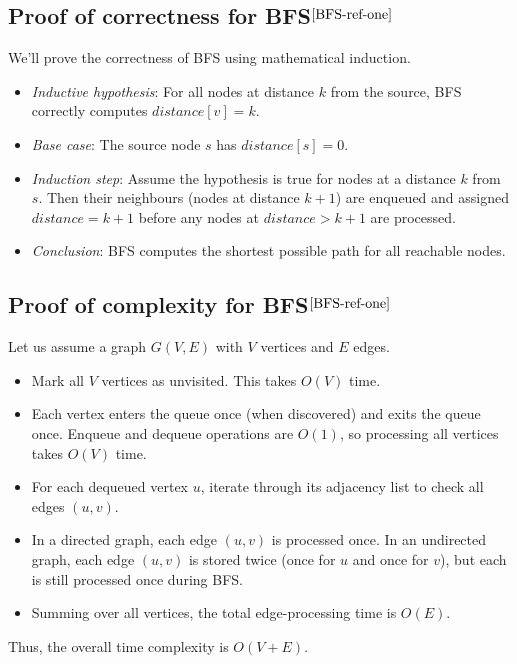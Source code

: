 \cleardoublepage
{}
\begin{appendices}
	\chapter{}
	\section{Proof of correctness for BFS$^{\cite{BFS-ref-one}}$}\label{appendix:bfs:correctness}
		We'll prove the correctness of BFS using mathematical induction.
		\begin{itemize}
			\item \textit{Inductive hypothesis}: For all nodes at distance
			$k$ from the source, BFS correctly computes $distance[v] = k$.
			\item \textit{Base case}: The source node $s$ has $distance[s] = 0$.
			\item \textit{Induction step}: Assume the hypothesis is true for nodes at a distance $k$ from $s$. Then their neighbours (nodes at distance $k + 1$) are enqueued and assigned $distance = k + 1$ before any nodes at $distance > k + 1$ are processed.
			\item \textit{Conclusion}: BFS computes the shortest possible path for all reachable nodes.
		\end{itemize}
	\section{Proof of complexity for BFS$^{\cite{BFS-ref-one}}$}\label{appendix:bfs:complexity}
		Let us assume a graph $G(V, E)$ with $V$ vertices and $E$ edges.
	\begin{itemize}
		\item Mark all $V$ vertices as unvisited. This takes $O(V)$ time.
		\item Each vertex enters the queue once (when discovered) and exits the queue once. Enqueue and dequeue operations are $O(1)$, so processing all vertices takes $O(V)$ time.
		\item For each dequeued vertex $u$, iterate through its adjacency list to check all edges $(u,v)$.
		\item In a directed graph, each edge $(u,v)$ is processed once. In an undirected graph, each edge $(u,v)$ is stored twice (once for $u$ and once for $v$), but each is still processed once during BFS.
		\item Summing over all vertices, the total edge-processing time is $O(E)$.
	\end{itemize}
		Thus, the overall time complexity is $O(V+E)$.

\end{appendices}
